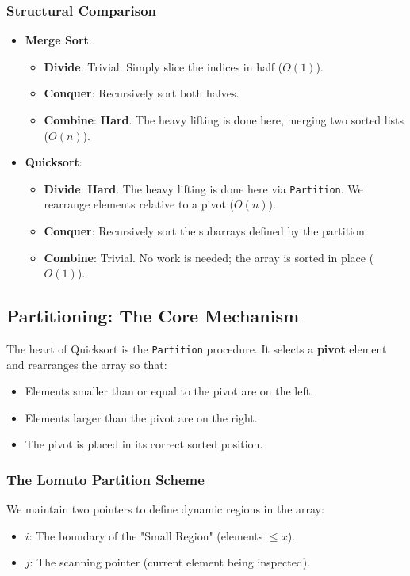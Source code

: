 \documentclass[12pt]{article}
\theoremstyle{blueplain}
\theoremstyle{bluedef}
\theoremstyle{blueremark}
\begin{document}
\subsubsection{Structural Comparison}
\begin{itemize}
    \item \textbf{Merge Sort}:
          \begin{itemize}
              \item \textbf{Divide}: Trivial. Simply slice the indices in half ($O(1)$).
              \item \textbf{Conquer}: Recursively sort both halves.
              \item \textbf{Combine}: \textbf{Hard}. The heavy lifting is done here, merging two sorted lists ($O(n)$).
          \end{itemize}
    \item \textbf{Quicksort}:
          \begin{itemize}
              \item \textbf{Divide}: \textbf{Hard}. The heavy lifting is done here via \texttt{Partition}. We rearrange elements relative to a pivot ($O(n)$).
              \item \textbf{Conquer}: Recursively sort the subarrays defined by the partition.
              \item \textbf{Combine}: Trivial. No work is needed; the array is sorted in place ($O(1)$).
          \end{itemize}
\end{itemize}

\subsection{Partitioning: The Core Mechanism}

The heart of Quicksort is the \texttt{Partition} procedure. It selects a \textbf{pivot} element and rearranges the array so that:
\begin{itemize}
    \item Elements smaller than or equal to the pivot are on the left.
    \item Elements larger than the pivot are on the right.
    \item The pivot is placed in its correct sorted position.
\end{itemize}

\subsubsection{The Lomuto Partition Scheme}
We maintain two pointers to define dynamic regions in the array:
\begin{itemize}
    \item \textbf{$i$}: The boundary of the "Small Region" (elements $\le x$).
    \item \textbf{$j$}: The scanning pointer (current element being inspected).
\end{itemize}
\end{document}
